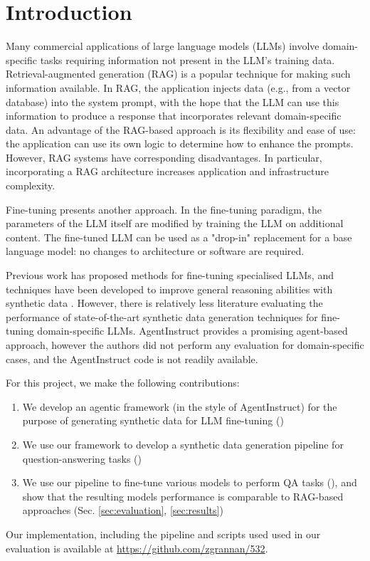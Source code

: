 \section{Introduction}
Many commercial applications of large language models (LLMs) involve
domain-specific tasks requiring information not present in the LLM’s
training data. Retrieval-augmented generation (RAG)
\citep{lewis_retrieval-augmented_2020} is a popular technique for making such
information available. In RAG, the application injects data (e.g., from a
vector database) into the system prompt, with the hope that the LLM can use this
information to produce a response that incorporates relevant domain-specific
data. An advantage of the RAG-based approach is its flexibility and ease of use:
the application can use its own logic to determine how to enhance the prompts.
However, RAG systems have corresponding disadvantages. In particular,
incorporating a RAG architecture increases application and infrastructure
complexity.

Fine-tuning presents another approach. In the fine-tuning paradigm, the
parameters of the LLM itself are modified by training the LLM on additional
content. The fine-tuned LLM can be used as a "drop-in" replacement for a base
language model: no changes to architecture or software are required.

Previous work \citep{balaguer_rag_2024,yang_fingpt_2023,wu_pmc-llama_2023} has
proposed methods for fine-tuning specialised LLMs, and techniques have been
developed to improve general reasoning abilities with synthetic data
\citep{shao_synthetic_2023,wang_self-instruct_2023}. However, there is
relatively less literature evaluating the performance of state-of-the-art
synthetic data generation techniques for fine-tuning domain-specific LLMs.
AgentInstruct \citep{mitra_agentinstruct_2024} provides a promising agent-based
approach, however the authors did not perform any evaluation for domain-specific
cases, and the AgentInstruct code is not readily available.

For this project, we make the following contributions:

\begin{enumerate}
\item We develop an agentic framework (in the style of AgentInstruct) for the purpose
of generating synthetic data for LLM fine-tuning ()
\item We use our framework to develop a synthetic data generation pipeline for question-answering tasks
()
\item We use our pipeline to fine-tune various models to perform QA tasks (), and show that
the resulting models performance is comparable to RAG-based approaches (Sec. \ref{sec:evaluation}, \ref{sec:results})
\end{enumerate}

Our implementation, including the pipeline and scripts used used in our
evaluation is available at \url{https://github.com/zgrannan/532}.

